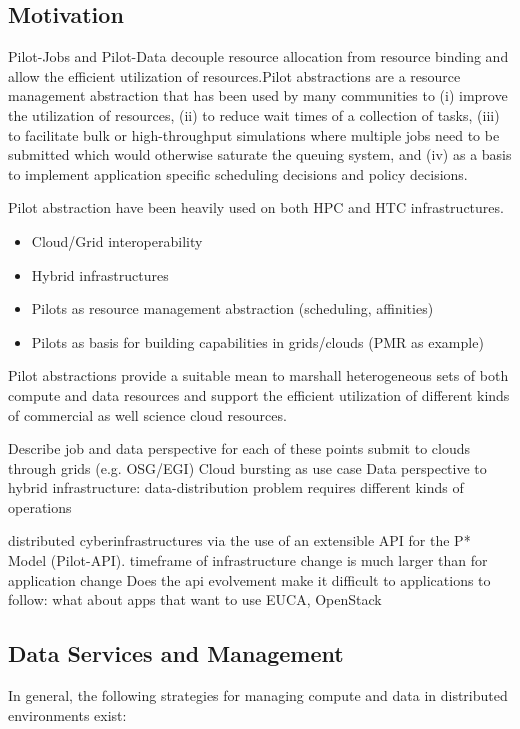 \documentclass[times]{cpeauth}
\newcommand{\pilot}{Pilot\xspace}
\newcommand{\pilotjobs}{Pilot-Jobs\xspace}
\newcommand{\pilotdata}{Pilot-Data\xspace}
\begin{document}
\subsection{Motivation}

\pilotjobs and \pilotdata decouple resource allocation from resource binding
and allow the efficient utilization of resources.\pilot abstractions are a
resource management abstraction that has been used by many communities to (i)
improve the utilization of resources, (ii) to reduce wait times of a
collection of tasks, (iii) to facilitate bulk or high-throughput simulations
where multiple jobs need to be submitted which would otherwise saturate the
queuing system, and (iv) as a basis to implement application specific
scheduling decisions and policy decisions.


Pilot abstraction have been heavily used on both HPC and HTC infrastructures. 
\begin{itemize}
	\item Cloud/Grid interoperability
	\item Hybrid infrastructures 
	\item Pilots as resource management abstraction (scheduling, affinities)
	\item Pilots as basis for building capabilities in grids/clouds (PMR as 
	example)
\end{itemize}


Pilot abstractions provide a suitable mean to marshall heterogeneous sets of 
both compute and data resources and support the efficient utilization of 
different kinds of commercial as well science cloud resources.

Describe job and data perspective for each of these points
submit to clouds through grids (e.g. OSG/EGI)
Cloud bursting as use case
Data perspective to hybrid infrastructure: data-distribution problem requires different kinds of operations

distributed cyberinfrastructures via the use of an extensible API for the P* Model (Pilot-API).
timeframe of infrastructure change is much larger than for application change
Does the api evolvement make it difficult to applications to follow: what 
about apps that want to use EUCA, OpenStack


\subsection{Data Services and Management}

In general, the following strategies for managing compute and
data in distributed environments exist:
\end{document}
